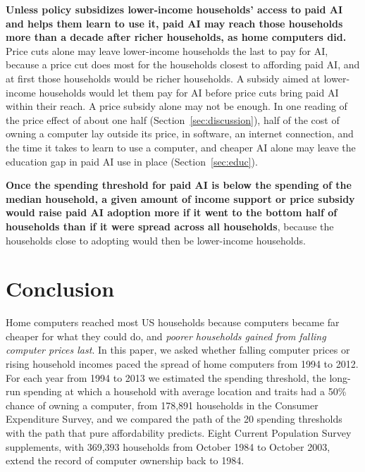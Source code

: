 \documentclass[11pt]{article}
\begin{document}
\textbf{Unless policy subsidizes lower-income households' access to paid AI and helps them learn to use it, paid AI may reach those households more than a decade after richer households, as home computers did.} Price cuts alone may leave lower-income households the last to pay for AI, because a price cut does most for the households closest to affording paid AI, and at first those households would be richer households. A subsidy aimed at lower-income households would let them pay for AI before price cuts bring paid AI within their reach. A price subsidy alone may not be enough. In one reading of the price effect of about one half (Section~\ref{sec:discussion}), half of the cost of owning a computer lay outside its price, in software, an internet connection, and the time it takes to learn to use a computer, and cheaper AI alone may leave the education gap in paid AI use in place (Section~\ref{sec:educ}).

\textbf{Once the spending threshold for paid AI is below the spending of the median household, a given amount of income support or price subsidy would raise paid AI adoption more if it went to the bottom half of households than if it were spread across all households}, because the households close to adopting would then be lower-income households.

\section{Conclusion}
\label{sec:conclusion}

Home computers reached most US households because computers became far cheaper for what they could do, and \emph{poorer households gained from falling computer prices last}. In this paper, we asked whether falling computer prices or rising household incomes paced the spread of home computers from 1994 to 2012. For each year from 1994 to 2013 we estimated the spending threshold, the long-run spending at which a household with average location and traits had a 50\% chance of owning a computer, from 178{,}891 households in the Consumer Expenditure Survey, and we compared the path of the 20 spending thresholds with the path that pure affordability predicts. Eight Current Population Survey supplements, with 369{,}393 households from October 1984 to October 2003, extend the record of computer ownership back to 1984.
\end{document}
